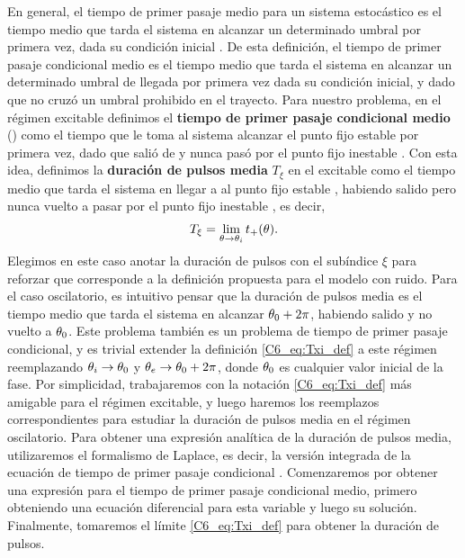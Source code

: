 \documentclass[./main.tex]{subfiles}
\begin{document}
En general, el tiempo de primer pasaje medio para un sistema estocástico es el tiempo medio que tarda el sistema en alcanzar un determinado umbral por primera vez, dada su condición inicial \cite{Redner2001}. De esta definición, el tiempo de primer pasaje condicional medio es el tiempo medio que tarda el sistema en alcanzar un determinado umbral de llegada por primera vez dada su condición inicial, y dado que no cruzó un umbral prohibido en el trayecto. Para nuestro problema, en el régimen excitable definimos el \textbf{tiempo de primer pasaje condicional medio} \tplus(\xx) como el tiempo que le toma al sistema alcanzar el punto fijo estable \xxe por primera vez, dado que salió de \xx y nunca pasó por el punto fijo inestable \xxi. Con esta idea, definimos la \textbf{duración de pulsos media} $T_\xi$ en el excitable como el tiempo medio que tarda el sistema en llegar a al punto fijo estable \xxe, habiendo salido pero nunca vuelto a pasar por el punto fijo inestable \xxi, es decir,
\begin{align}
    T_\xi = \lim_{\theta \rightarrow \theta_i}t_{+}(\theta).
    \label{C6_eq:Txi_def}
\end{align}
Elegimos en este caso anotar la duración de pulsos con el subíndice $\xi$ para reforzar que corresponde a la definición propuesta para el modelo con ruido. Para el caso oscilatorio, es intuitivo pensar que la duración de pulsos media es el tiempo medio que tarda el sistema en alcanzar $\theta_0+2\pi$, habiendo salido y no vuelto a $\theta_0$. Este problema también es un problema de tiempo de primer pasaje condicional, y es trivial extender la definición \ref{C6_eq:Txi_def} a este régimen reemplazando $\theta_i \rightarrow \theta_0$ y $\theta_e \rightarrow \theta_0+2\pi$, donde $\theta_0$ es cualquier valor inicial de la fase. Por simplicidad, trabajaremos con la notación \ref{C6_eq:Txi_def} más amigable para el régimen excitable, y luego haremos los reemplazos correspondientes para estudiar la duración de pulsos media en el régimen oscilatorio. Para obtener una expresión analítica de la duración de pulsos media, utilizaremos el formalismo de Laplace, es decir, la versión integrada de la ecuación de tiempo de primer pasaje condicional \cite{Redner2001}. Comenzaremos por obtener una expresión para el tiempo de primer pasaje condicional medio, primero obteniendo una ecuación diferencial para esta variable y luego su solución. Finalmente, tomaremos el límite \ref{C6_eq:Txi_def} para obtener la duración de pulsos.
\end{document}
